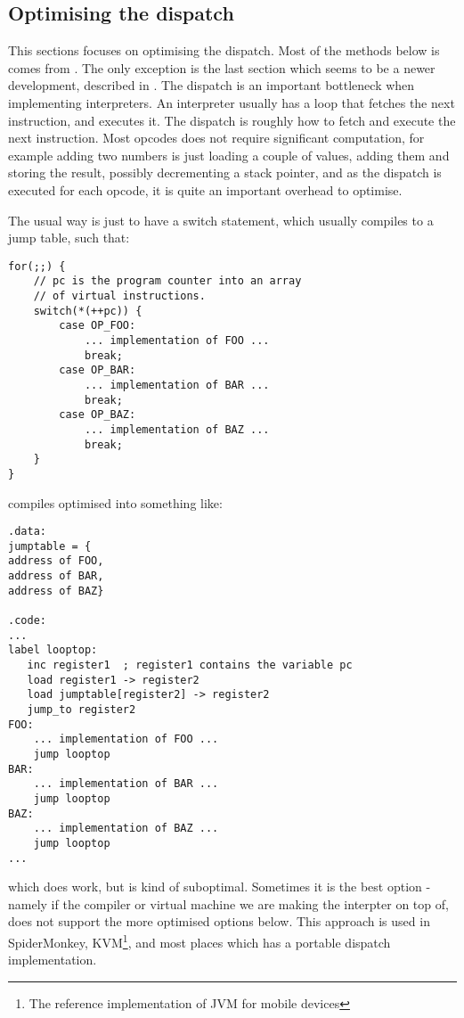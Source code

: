 \subsection{Optimising the dispatch}
This sections focuses on optimising the dispatch. Most of the methods below is comes from \cite{dispatch1, dispatch2}. The only exception is the last section which seems to be a newer development, described in \cite{dalvik-talk}.
The dispatch is an important bottleneck when implementing interpreters. 
An interpreter usually has a loop that fetches the next instruction, and executes it. The dispatch is roughly how to fetch and execute the next instruction.
Most opcodes does not require significant computation, for example adding two numbers is just loading a couple of values, adding them and storing the result, possibly decrementing a stack pointer, and as the dispatch is executed for each opcode, it is quite an important overhead to optimise. 

The usual way is just to have a switch statement, which usually compiles to a jump table, such that:
\begin{verbatim}
for(;;) {
    // pc is the program counter into an array
    // of virtual instructions.
    switch(*(++pc)) { 
        case OP_FOO:
            ... implementation of FOO ...
            break; 
        case OP_BAR:
            ... implementation of BAR ...
            break; 
        case OP_BAZ:
            ... implementation of BAZ ...
            break; 
    }
}
\end{verbatim}
compiles optimised into something like:
\begin{verbatim}
.data:
jumptable = {
address of FOO,
address of BAR,
address of BAZ}

.code:
...
label looptop:
   inc register1  ; register1 contains the variable pc
   load register1 -> register2
   load jumptable[register2] -> register2
   jump_to register2
FOO:
    ... implementation of FOO ...
    jump looptop
BAR:
    ... implementation of BAR ...
    jump looptop
BAZ:
    ... implementation of BAZ ...
    jump looptop
...
\end{verbatim}
which does work, but is kind of suboptimal.
Sometimes it is the best option - namely if the compiler or virtual machine we are making the interpter on top of, does not support the more optimised options below.
This approach is used in SpiderMonkey, KVM\footnote{The reference implementation of JVM for mobile devices}, and most places which has a portable dispatch implementation.

